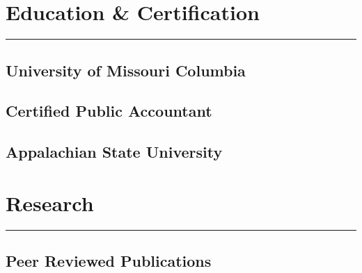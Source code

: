 \documentclass[]{deedy-resume-openfont}
\begin{document}
\section{Education \& Certification}
\vspace*{-.25cm}
\rule{\textwidth}{0.3pt}
\begin{minipage}[t]{0.5\textwidth} 

\subsection{University of Missouri Columbia}

\sectionsep

\subsection{Certified Public Accountant}

\sectionsep

\end{minipage} 
\hfill
\begin{minipage}[t]{0.49\textwidth} 

\subsection{Appalachian State University }
\end{minipage} 




\section{Research}
\vspace*{-.25cm}
\rule{\textwidth}{0.1pt}

\vspace*{.15cm}
\subsection{Peer Reviewed Publications} 
\vspace*{-.4cm}
\end{document}
